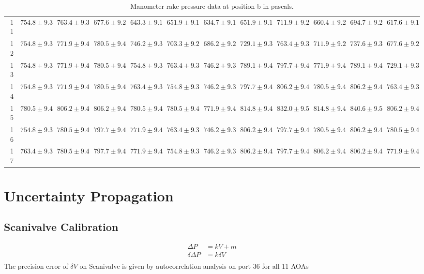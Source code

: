\documentclass[runningheads]{llncs}
\begin{document}
\begin{table}
\begin{center}
\begin{tabular}{rrrrrrrrrrrr}
11 &  $754.8\pm9.3$ &  $763.4\pm9.3$ &  $677.6\pm9.2$ &  $643.3\pm9.1$ &  $651.9\pm9.1$ &  $634.7\pm9.1$ &  $651.9\pm9.1$ &  $711.9\pm9.2$ &  $660.4\pm9.2$ &  $694.7\pm9.2$ &  $617.6\pm9.1$ \\
12 &  $754.8\pm9.3$ &  $771.9\pm9.4$ &  $780.5\pm9.4$ &  $746.2\pm9.3$ &  $703.3\pm9.2$ &  $686.2\pm9.2$ &  $729.1\pm9.3$ &  $763.4\pm9.3$ &  $711.9\pm9.2$ &  $737.6\pm9.3$ &  $677.6\pm9.2$ \\
13 &  $754.8\pm9.3$ &  $771.9\pm9.4$ &  $780.5\pm9.4$ &  $754.8\pm9.3$ &  $763.4\pm9.3$ &  $746.2\pm9.3$ &  $789.1\pm9.4$ &  $797.7\pm9.4$ &  $771.9\pm9.4$ &  $789.1\pm9.4$ &  $729.1\pm9.3$ \\
14 &  $754.8\pm9.3$ &  $771.9\pm9.4$ &  $780.5\pm9.4$ &  $763.4\pm9.3$ &  $754.8\pm9.3$ &  $746.2\pm9.3$ &  $797.7\pm9.4$ &  $806.2\pm9.4$ &  $780.5\pm9.4$ &  $806.2\pm9.4$ &  $763.4\pm9.3$ \\
15 &  $780.5\pm9.4$ &  $806.2\pm9.4$ &  $806.2\pm9.4$ &  $780.5\pm9.4$ &  $780.5\pm9.4$ &  $771.9\pm9.4$ &  $814.8\pm9.4$ &  $832.0\pm9.5$ &  $814.8\pm9.4$ &  $840.6\pm9.5$ &  $806.2\pm9.4$ \\
16 &  $754.8\pm9.3$ &  $780.5\pm9.4$ &  $797.7\pm9.4$ &  $771.9\pm9.4$ &  $763.4\pm9.3$ &  $746.2\pm9.3$ &  $806.2\pm9.4$ &  $797.7\pm9.4$ &  $780.5\pm9.4$ &  $806.2\pm9.4$ &  $780.5\pm9.4$ \\
17 &  $763.4\pm9.3$ &  $780.5\pm9.4$ &  $797.7\pm9.4$ &  $771.9\pm9.4$ &  $754.8\pm9.3$ &  $746.2\pm9.3$ &  $806.2\pm9.4$ &  $797.7\pm9.4$ &  $806.2\pm9.4$ &  $806.2\pm9.4$ &  $771.9\pm9.4$ \\
\bottomrule
\end{tabular}
\end{center}
\caption{Manometer rake pressure data at position b in pascals.}
\label{tab:pressure_manometer_rake_b}
\end{table}
\newpage
\section{Uncertainty Propagation}

\subsection{Scanivalve Calibration}

\begin{align*}
    \Delta P &= kV + m \\
    \delta \Delta P &= k\delta V\\
\end{align*}
The precision error of $\delta V$ on Scanivalve is given by autocorrelation analysis on port 36 for all 11 AOAs 
\end{document}
